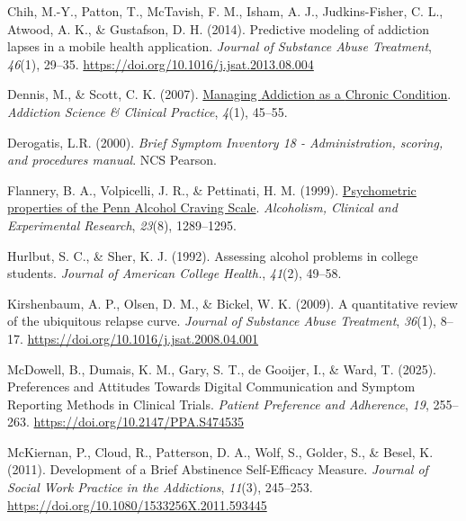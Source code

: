 \documentclass[
  letterpaper,
  DIV=11,
  numbers=noendperiod]{scrartcl}
\newlength{\cslhangindent}
\newenvironment{CSLReferences}[2] %
 {\begin{list}{}{%
  \setlength{\itemindent}{0pt}
  \setlength{\leftmargin}{0pt}
  \setlength{\parsep}{0pt}
  \ifodd #1
   \setlength{\leftmargin}{\cslhangindent}
   \setlength{\itemindent}{-1\cslhangindent}
  \fi
  \setlength{\itemsep}{#2\baselineskip}}}
 {\end{list}}
\begin{document}
\label{refs}
\begin{CSLReferences}{1}{0}
Chih, M.-Y., Patton, T., McTavish, F. M., Isham, A. J., Judkins-Fisher,
C. L., Atwood, A. K., \& Gustafson, D. H. (2014). Predictive modeling of
addiction lapses in a mobile health application. \emph{Journal of
Substance Abuse Treatment}, \emph{46}(1), 29--35.
\url{https://doi.org/10.1016/j.jsat.2013.08.004}

Dennis, M., \& Scott, C. K. (2007).
\href{https://www.ncbi.nlm.nih.gov/pmc/articles/PMC2797101}{Managing
{Addiction} as a {Chronic Condition}}. \emph{Addiction Science \&
Clinical Practice}, \emph{4}(1), 45--55.

Derogatis, L.R. (2000). \emph{Brief {Symptom Inventory} 18 -
{Administration}, scoring, and procedures manual}. NCS Pearson.

Flannery, B. A., Volpicelli, J. R., \& Pettinati, H. M. (1999).
\href{https://www.ncbi.nlm.nih.gov/pubmed/10470970}{Psychometric
properties of the {Penn Alcohol Craving Scale}}. \emph{Alcoholism,
Clinical and Experimental Research}, \emph{23}(8), 1289--1295.

Hurlbut, S. C., \& Sher, K. J. (1992). Assessing alcohol problems in
college students. \emph{Journal of American College Health.},
\emph{41}(2), 49--58.

Kirshenbaum, A. P., Olsen, D. M., \& Bickel, W. K. (2009). A
quantitative review of the ubiquitous relapse curve. \emph{Journal of
Substance Abuse Treatment}, \emph{36}(1), 8--17.
\url{https://doi.org/10.1016/j.jsat.2008.04.001}

McDowell, B., Dumais, K. M., Gary, S. T., de Gooijer, I., \& Ward, T.
(2025). Preferences and {Attitudes Towards Digital Communication} and
{Symptom Reporting Methods} in {Clinical Trials}. \emph{Patient
Preference and Adherence}, \emph{19}, 255--263.
\url{https://doi.org/10.2147/PPA.S474535}

McKiernan, P., Cloud, R., Patterson, D. A., Wolf, S., Golder, S., \&
Besel, K. (2011). Development of a {Brief Abstinence Self-Efficacy
Measure}. \emph{Journal of Social Work Practice in the Addictions},
\emph{11}(3), 245--253.
\url{https://doi.org/10.1080/1533256X.2011.593445}


\end{CSLReferences}
\end{document}
